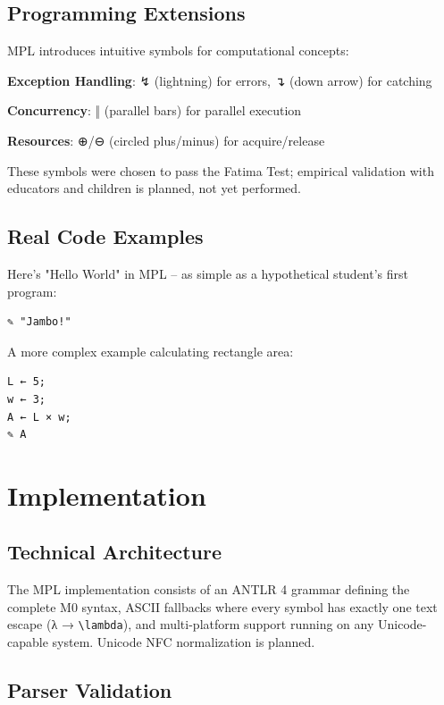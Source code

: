 \documentclass[10pt,conference]{IEEEtran}
\begin{document}
\subsection{Programming Extensions}

MPL introduces intuitive symbols for computational concepts:

\textbf{Exception Handling}: ↯ (lightning) for errors, ↴ (down arrow) for catching

\textbf{Concurrency}: ‖ (parallel bars) for parallel execution

\textbf{Resources}: ⊕/⊖ (circled plus/minus) for acquire/release

These symbols were chosen to pass the Fatima Test; empirical validation with educators and children is planned, not yet performed.

\subsection{Real Code Examples}

Here's "Hello World" in MPL – as simple as a hypothetical student's first program:

\begin{lstlisting}[language=MPL]
✎ "Jambo!"
\end{lstlisting}

A more complex example calculating rectangle area:

\begin{lstlisting}[language=MPL]
L ← 5;
w ← 3;
A ← L × w;
✎ A
\end{lstlisting}

\section{Implementation}

\subsection{Technical Architecture}

The MPL implementation consists of an ANTLR 4 grammar defining the complete M0 syntax, ASCII fallbacks where every symbol has exactly one text escape (λ → \texttt{\textbackslash lambda}), and multi-platform support running on any Unicode-capable system. Unicode NFC normalization is planned.

\subsection{Parser Validation}
\end{document}

